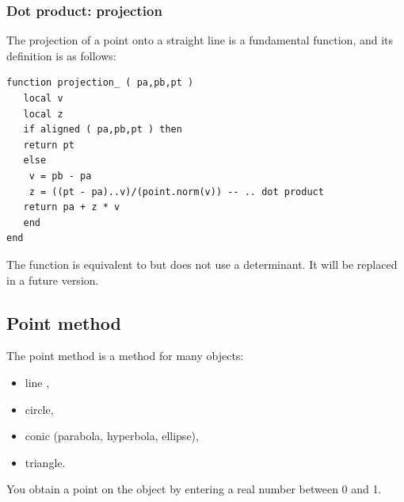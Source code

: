 \subsubsection{Dot product: projection} %
\label{ssub:scalar_product_projection}

The projection of a point onto a straight line is a fundamental function, and its definition is as follows:

\begin{Verbatim}
function projection_ ( pa,pb,pt )
   local v
   local z
   if aligned ( pa,pb,pt ) then
   return pt
   else
    v = pb - pa
    z = ((pt - pa)..v)/(point.norm(v)) -- .. dot product
   return pa + z * v  
   end
end
\end{Verbatim}

The function   is equivalent to    but does not use a determinant. It will be replaced in a future version.


\subsection{Point method} %
\label{sub:point_method}

The point  method is a method for many objects: 
\begin{itemize}
 \item line ,
 \item circle,
 \item conic (parabola, hyperbola, ellipse),
 \item triangle.
\end{itemize}

You obtain a point on the object by entering a real number between 0 and 1. 

